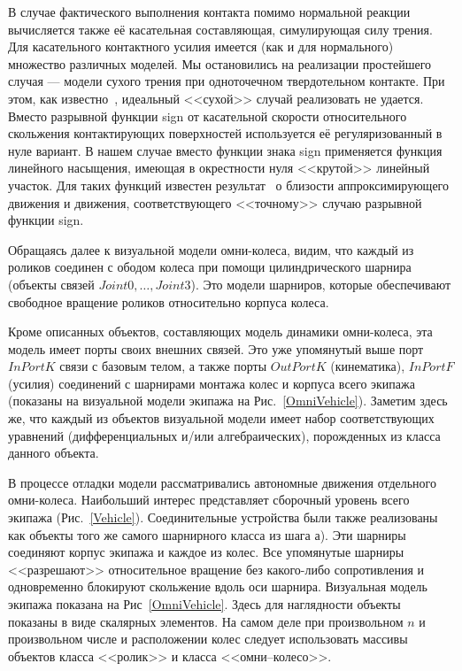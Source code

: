 В случае фактического выполнения контакта помимо нормальной реакции вычисляется
также её касательная составляющая, симулирующая силу трения. Для касательного 
контактного усилия имеется (как и для нормального) множество различных моделей. 
Мы остановились на реализации простейшего случая --- модели сухого трения при 
одноточечном твердотельном контакте. При этом, как известно~\cite{Novozhilov}, 
идеальный <<сухой>> случай реализовать не удается. Вместо разрывной функции 
sign от касательной скорости относительного скольжения контактирующих 
поверхностей используется её регуляризованный в нуле вариант. В нашем случае 
вместо функции знака sign применяется функция линейного насыщения, имеющая в 
окрестности нуля <<крутой>> линейный участок. Для таких функций известен 
результат~\cite{Novozhilov} о близости аппроксимирующего движения и движения, 
соответствующего <<точному>> случаю разрывной функции sign.

Обращаясь далее к визуальной модели омни-колеса, видим, что каждый из роликов 
соединен с ободом колеса при помощи цилиндрического шарнира (объекты связей
$Joint0,\dots ,Joint3$). Это модели шарниров, которые обеспечивают свободное
вращение роликов относительно корпуса колеса.

Кроме описанных объектов, составляющих модель динамики омни-колеса, эта модель
имеет порты своих внешних связей. Это уже упомянутый выше порт $InPortK$ связи
с базовым телом, а также порты $OutPortK$ (кинематика), $InPortF$ (усилия) 
соединений с шарнирами монтажа колес и корпуса всего экипажа (показаны на 
визуальной модели экипажа на Рис.~\ref{OmniVehicle}). Заметим здесь же, что 
каждый из объектов визуальной модели имеет набор соответствующих уравнений
(дифференциальных и/или алгебраических), порожденных из класса данного объекта.

В процессе отладки модели рассматривались автономные движения отдельного 
омни-колеса. Наибольший интерес представляет сборочный уровень всего экипажа
(Рис.~\ref{Vehicle}). Соединительные устройства были также реализованы как 
объекты того же самого шарнирного класса из шага а). Эти шарниры соединяют 
корпус экипажа и каждое из колес. Все упомянутые шарниры <<разрешают>> 
относительное вращение без какого-либо сопротивления и одновременно блокируют
скольжение вдоль оси шарнира. Визуальная модель экипажа показана на 
Рис~\ref{OmniVehicle}. Здесь для наглядности объекты показаны в виде скалярных
элементов. На самом деле при произвольном $n$ и произвольном числе и 
расположении колес следует использовать массивы объектов класса <<ролик>> и 
класса <<омни--колесо>>.

